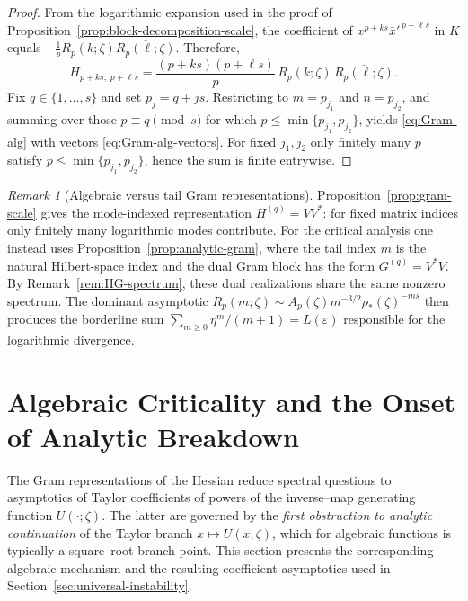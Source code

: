 \documentclass[11pt]{amsart}
\numberwithin{equation}{section}
\theoremstyle{plain}
\theoremstyle{definition}
\theoremstyle{remark}
\newtheorem{remark}[theorem]{Remark}
\begin{document}
\begin{proof}
	From the logarithmic expansion used in the proof of Proposition~\ref{prop:block-decomposition-scale},
	the coefficient of $x^{p+ks}\bar x'^{\,p+\ell s}$ in $K$ equals
	$-\frac{1}{p}R_p(k;\zeta)\overline{R_p(\ell;\zeta)}$. Therefore,
	\[
		H_{p+ks,\;p+\ell s}
		=
		\frac{(p+ks)(p+\ell s)}{p}\,
		R_p(k;\zeta)\,\overline{R_p(\ell;\zeta)}.
	\]
	Fix $q\in\{1,\dots,s\}$ and set $p_j=q+js$. Restricting to $m=p_{j_1}$ and $n=p_{j_2}$, and summing
	over those $p\equiv q\pmod{s}$ for which $p\le \min\{p_{j_1},p_{j_2}\}$, yields \eqref{eq:Gram-alg}
	with vectors \eqref{eq:Gram-alg-vectors}. For fixed $j_1,j_2$ only finitely many $p$ satisfy
	$p\le \min\{p_{j_1},p_{j_2}\}$, hence the sum is finite entrywise.
\end{proof}

\begin{remark}[Algebraic versus tail Gram representations]
	\label{rem:alg-vs-tail-gram}
	Proposition~\ref{prop:gram-scale} gives the mode-indexed representation
	\(H^{(q)}=VV^*\): for fixed matrix indices only finitely many logarithmic
	modes contribute. For the critical analysis one instead uses
	Proposition~\ref{prop:analytic-gram}, where the tail index \(m\) is the
	natural Hilbert-space index and the dual Gram block has the form \(G^{(q)}=V^*V\).
	By Remark~\ref{rem:HG-spectrum}, these dual realizations share the same nonzero
	spectrum. The dominant asymptotic
	$R_p(m;\zeta)\sim A_p(\zeta)m^{-3/2}\rho_*(\zeta)^{-ms}$ then produces the
	borderline sum $\sum_{m\ge0}\eta^m/(m+1)=L(\varepsilon)$ responsible for the
	logarithmic divergence.
\end{remark}


\section{Algebraic Criticality and the Onset of Analytic Breakdown}
\label{sec:alg-criticality}


The Gram representations of the Hessian reduce spectral questions to asymptotics of Taylor
coefficients of powers of the inverse--map generating function $U(\cdot;\zeta)$.  The latter are
governed by the \emph{first obstruction to analytic continuation} of the Taylor branch
$x\mapsto U(x;\zeta)$, which for algebraic functions is typically a square--root branch point.
This section presents the corresponding algebraic mechanism and the resulting coefficient asymptotics
used in Section~\ref{sec:universal-instability}.
\end{document}
